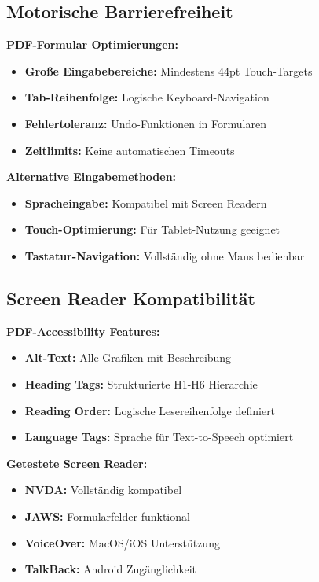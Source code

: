 \subsection{Motorische Barrierefreiheit}

\begin{ctmmPurpleBox}[title=Eingabehilfen und Navigation]

\textbf{PDF-Formular Optimierungen:}
\begin{itemize}
    \item \textbf{Große Eingabebereiche:} Mindestens 44pt Touch-Targets
    \item \textbf{Tab-Reihenfolge:} Logische Keyboard-Navigation
    \item \textbf{Fehlertoleranz:} Undo-Funktionen in Formularen
    \item \textbf{Zeitlimits:} Keine automatischen Timeouts
\end{itemize}

\textbf{Alternative Eingabemethoden:}
\begin{itemize}
    \item \textbf{Spracheingabe:} Kompatibel mit Screen Readern
    \item \textbf{Touch-Optimierung:} Für Tablet-Nutzung geeignet
    \item \textbf{Tastatur-Navigation:} Vollständig ohne Maus bedienbar
\end{itemize}

\end{ctmmPurpleBox}

\subsection{Screen Reader Kompatibilität}

\begin{ctmmBlueBox}[title=Assistive Technologie Support]

\textbf{PDF-Accessibility Features:}
\begin{itemize}
    \item \textbf{Alt-Text:} Alle Grafiken mit Beschreibung
    \item \textbf{Heading Tags:} Strukturierte H1-H6 Hierarchie
    \item \textbf{Reading Order:} Logische Lesereihenfolge definiert
    \item \textbf{Language Tags:} Sprache für Text-to-Speech optimiert
\end{itemize}

\textbf{Getestete Screen Reader:}
\begin{itemize}
    \item \textbf{NVDA:} Vollständig kompatibel
    \item \textbf{JAWS:} Formularfelder funktional
    \item \textbf{VoiceOver:} MacOS/iOS Unterstützung
    \item \textbf{TalkBack:} Android Zugänglichkeit
\end{itemize}

\end{ctmmBlueBox}

